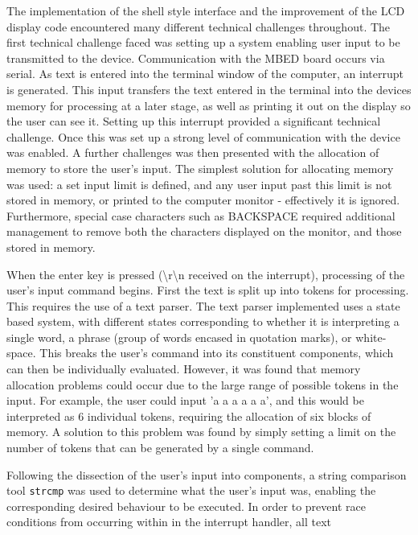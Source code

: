 The implementation of the shell style interface and the improvement of the LCD 
display code encountered many different technical challenges throughout. 
The first technical challenge faced was setting up a system enabling user input 
to be transmitted to the device. 
Communication with the MBED board occurs via serial. As text is entered into the 
terminal window of the computer, an interrupt is generated. This input transfers 
the text entered in the terminal into the devices memory for processing at a 
later stage, as well as printing it out on the display so the user can see it. 
Setting up this interrupt provided a significant technical challenge. 
Once this was set up a strong level of communication with the device was enabled. 
A further challenges was then presented with the allocation of memory to store the 
user's input. 
The simplest solution for allocating memory was used: a set input limit is 
defined, and any user input past this limit is not stored in memory, or printed 
to the computer monitor - effectively it is ignored. 
Furthermore, special case characters such as BACKSPACE required additional 
management to remove both the characters displayed on the monitor, and those 
stored in memory. 
\par\bigskip\noindent
When the enter key is pressed (\textbackslash r\textbackslash n received on 
the interrupt), processing of the user's input command begins. 
First the text is split up into tokens for processing. This 
requires the use of a text parser. The text parser implemented uses a state 
based system, with different states corresponding to whether it is interpreting 
a single word, a phrase (group of words encased in quotation marks), or 
white-space. This breaks the user's command into its constituent components, 
which can then be individually evaluated. However, it was found that memory 
allocation problems could occur due to the large range of possible tokens in 
the input. For example, the user could input 'a a a a a a', and this would be 
interpreted as 6 individual tokens, requiring the allocation of six blocks of 
memory. A solution to this problem was found by simply setting a limit on the 
number of tokens that can be generated by a single command. 
\par\bigskip\noindent
Following the dissection of the user's input into components, a string 
comparison tool \texttt{strcmp} was used to determine what the user's input was, 
enabling the corresponding desired behaviour to be executed. In order to 
prevent race conditions from occurring within in the interrupt handler, all text 
